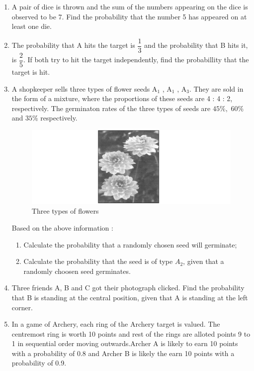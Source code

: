 \begin{enumerate}
\item A pair of dice is thrown and the sum of the numbers appearing on the dice is observed to be 7. Find the probability that the number 5 has appeared on at least one die.
\item The probability that A hits the target is $\dfrac{1}{3}$ and the probability that B hits it, is $\dfrac{2}{5}.$ If both try to hit the target independently, find the probabillity that the target is hit. 
\item A shopkeeper sells three types of flower seeds A$_1$ , A$_1$ , A$_3$. They are sold in the form of a mixture, where the proportions of these seeds are  4 : 4 : 2, respectively. The germinaton rates of the three types of seeds are $45\%,$ $60\%$ and $35\%$ respectively.
\begin{figure}[!ht]
\centering                                  \includegraphics[width=\columnwidth]{figs/flowers}                                     
\caption{Three types of flowers}            
\label{fig:flowers11}                       
\end{figure}
\newline Based on  the above information :
\begin{enumerate}
\item  Calculate the probability that a randomly chosen seed will germinate;
\item  Calculate the probability  that the seed is of type $A_2$, given that a randomly choosen seed germinates.
\end{enumerate}
\item Three friends A, B and C got their photograph clicked. Find the probability that B is standing at the central position, given that A is standing at the left corner.
\item In a game of Archery, each ring of the Archery target is valued. The centremost ring is worth 10 points and rest of the rings are alloted points 9 to 1 in sequential order moving outwards.Archer A is likely to earn 10 points with a probability of 0.8 and Archer B is likely the earn 10 points with a probability of 0.9.

\end{enumerate}
